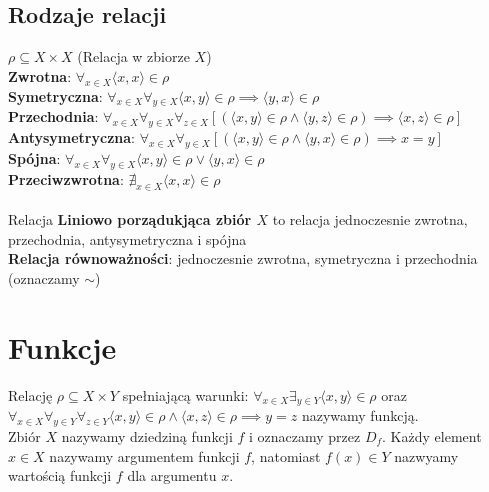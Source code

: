 \documentclass[a4paper,12pt]{article}
\begin{document}
\subsection{Rodzaje relacji}
$\rho \subseteq X \times X$ (Relacja w zbiorze $X$)\\
\textbf{Zwrotna}: $\forall_{x \in X} \langle x, x \rangle \in \rho $ \\
\textbf{Symetryczna}: $\forall_{x \in X} \forall_{y\in X}\langle x,y \rangle \in \rho \implies \langle y, x \rangle \in \rho $ \\
\textbf{Przechodnia}: $\forall_{x \in X} \forall_{y\in X} \forall_{z\in X} [(\langle x, y \rangle \in \rho \wedge \langle y, z \rangle \in \rho ) \implies \langle x, z \rangle \in \rho ]$ \\
\textbf{Antysymetryczna}: $\forall_{x \in X} \forall_{y\in X} [(\langle x, y \rangle \in \rho \wedge \langle y, x \rangle \in \rho ) \implies x=y]$ \\
\textbf{Spójna}: $\forall_{x \in X}\forall_{y\in X} \langle x,y \rangle\in\rho \vee \langle y,x\rangle\in\rho$\\
\textbf{Przeciwzwrotna}: $\nexists_{x\in X} \langle x,x\rangle \in \rho$\\
\\
Relacja \textbf{Liniowo porządukjąca zbiór $X$} to relacja jednoczesnie zwrotna, przechodnia, antysymetryczna i spójna \\
\textbf{Relacja równoważności}: jednoczesnie zwrotna, symetryczna i przechodnia (oznaczamy $ \sim $)

\section{Funkcje}
Relację $\rho \subseteq X \times Y$ spełniającą warunki: $\forall_{x\in X} \exists_{y \in Y} \langle x, y \rangle \in \rho $ oraz $\forall_{x\in X} \forall_{y \in Y} \forall_{z \in Y} \langle x,y \rangle \in \rho \wedge\langle x, z \rangle \in \rho \implies y=z$ nazywamy funkcją.\\
Zbiór $X$ nazywamy dziedziną funkcji $f$ i oznaczamy przez $D_f$. Każdy element $x \in X$ nazywamy argumentem funkcji $f$, natomiast $f(x)\in Y$ nazwyamy wartością funkcji $f$ dla argumentu $x$. \\
\end{document}
